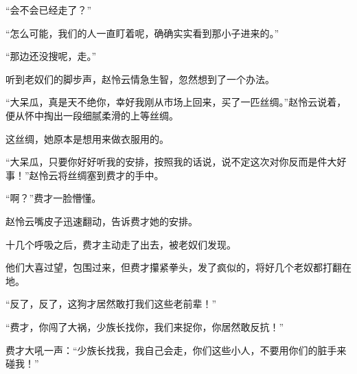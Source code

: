 \begin{this_body}
“会不会已经走了？”

“怎么可能，我们的人一直盯着呢，确确实实看到那小子进来的。”

“那边还没搜呢，走。”

听到老奴们的脚步声，赵怜云情急生智，忽然想到了一个办法。

“大呆瓜，真是天不绝你，幸好我刚从市场上回来，买了一匹丝绸。”赵怜云说着，便从怀中掏出一段细腻柔滑的上等丝绸。

这丝绸，她原本是想用来做衣服用的。

“大呆瓜，只要你好好听我的安排，按照我的话说，说不定这次对你反而是件大好事！”赵怜云将丝绸塞到费才的手中。

“啊？”费才一脸懵懂。

赵怜云嘴皮子迅速翻动，告诉费才她的安排。

十几个呼吸之后，费才主动走了出去，被老奴们发现。

他们大喜过望，包围过来，但费才攥紧拳头，发了疯似的，将好几个老奴都打翻在地。

“反了，反了，这狗才居然敢打我们这些老前辈！”

“费才，你闯了大祸，少族长找你，我们来捉你，你居然敢反抗！”

费才大吼一声：“少族长找我，我自己会走，你们这些小人，不要用你们的脏手来碰我！”

\end{this_body}

